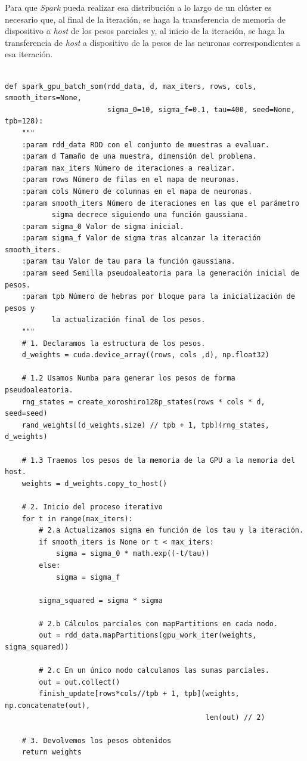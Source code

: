 Para que \textit{Spark} pueda realizar esa distribución a lo largo de un clúster es necesario que, al final de la iteración, se haga la transferencia de memoria de dispositivo a \textit{host} de los pesos parciales y, al inicio de la iteración, se haga la transferencia de \textit{host} a dispositivo de la pesos de las neuronas correspondientes a esa iteración.\\

\begin{code}
\begin{verbatim}

def spark_gpu_batch_som(rdd_data, d, max_iters, rows, cols, smooth_iters=None,
                        sigma_0=10, sigma_f=0.1, tau=400, seed=None, tpb=128):
    """
    :param rdd_data RDD con el conjunto de muestras a evaluar.
    :param d Tamaño de una muestra, dimensión del problema.
    :param max_iters Número de iteraciones a realizar.
    :param rows Número de filas en el mapa de neuronas.
    :param cols Número de columnas en el mapa de neuronas.
    :param smooth_iters Número de iteraciones en las que el parámetro
           sigma decrece siguiendo una función gaussiana. 
    :param sigma_0 Valor de sigma inicial.
    :param sigma_f Valor de sigma tras alcanzar la iteración smooth_iters.
    :param tau Valor de tau para la función gaussiana.
    :param seed Semilla pseudoaleatoria para la generación inicial de pesos.
    :param tpb Número de hebras por bloque para la inicialización de pesos y
           la actualización final de los pesos.
    """
    # 1. Declaramos la estructura de los pesos.
    d_weights = cuda.device_array((rows, cols ,d), np.float32)

    # 1.2 Usamos Numba para generar los pesos de forma pseudoaleatoria.
    rng_states = create_xoroshiro128p_states(rows * cols * d, seed=seed)
    rand_weights[(d_weights.size) // tpb + 1, tpb](rng_states, d_weights)
     
    # 1.3 Traemos los pesos de la memoria de la GPU a la memoria del host.
    weights = d_weights.copy_to_host()

    # 2. Inicio del proceso iterativo
    for t in range(max_iters):
        # 2.a Actualizamos sigma en función de los tau y la iteración.
        if smooth_iters is None or t < max_iters:
            sigma = sigma_0 * math.exp((-t/tau))
        else:
            sigma = sigma_f
            
        sigma_squared = sigma * sigma
        
        # 2.b Cálculos parciales con mapPartitions en cada nodo.
        out = rdd_data.mapPartitions(gpu_work_iter(weights, sigma_squared))
        
        # 2.c En un único nodo calculamos las sumas parciales.
        out = out.collect()
        finish_update[rows*cols//tpb + 1, tpb](weights, np.concatenate(out), 
                                               len(out) // 2)
       
    # 3. Devolvemos los pesos obtenidos
    return weights
\end{verbatim}
\label{code:somspark}
\end{code}

